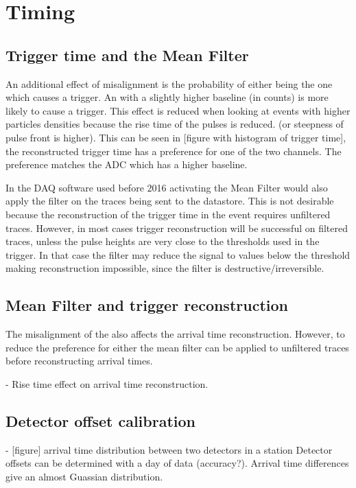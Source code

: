 \section{Timing}


\subsection{Trigger time and the Mean Filter}

An additional effect of misalignment is the probability of either \adc being the one which causes a trigger. An \adc with a slightly higher baseline (in \adc counts) is more likely to cause a trigger. This effect is reduced when looking at events with higher particles densities because the rise time of the pulses is reduced. (or steepness of pulse front is higher). This can be seen in [figure with histogram of trigger time], the reconstructed trigger time has a preference for one of the two channels. The preference matches the ADC which has a higher baseline.

In the DAQ software used before 2016 activating the Mean Filter would also apply the filter on the traces being sent to the datastore. This is not desirable because the reconstruction of the trigger time in the event requires unfiltered traces. However, in most cases trigger reconstruction will be successful on filtered traces, unless the pulse heights are very close to the thresholds used in the trigger. In that case the filter may reduce the signal to values below the threshold making reconstruction impossible, since the filter is destructive/irreversible.


\subsection{Mean Filter and trigger reconstruction}

The misalignment of the \adcs also affects the arrival time reconstruction. However, to reduce the preference for either \adc the mean filter can be applied to unfiltered traces before reconstructing arrival times.

- Rise time effect on arrival time reconstruction.


\subsection{Detector offset calibration}

- [figure] arrival time distribution between two detectors in a station
  Detector offsets can be determined with a day of data (accuracy?). Arrival
  time differences give an almost Guassian distribution.

